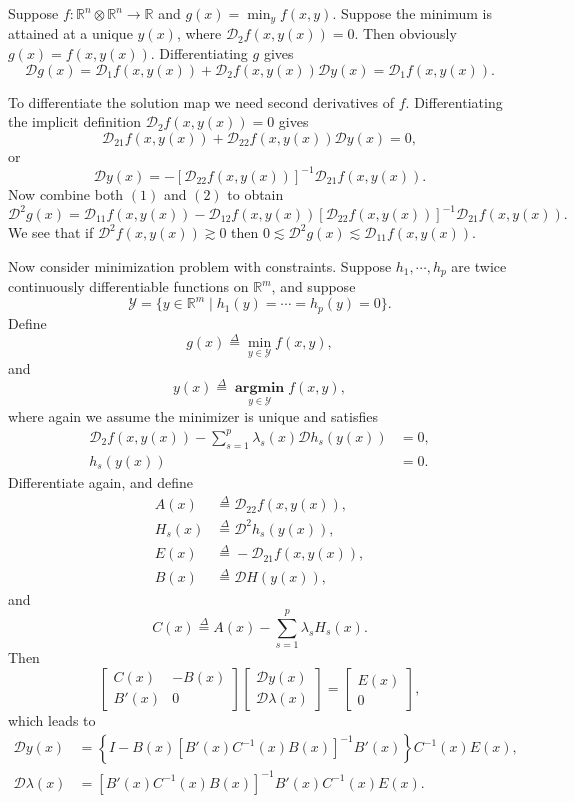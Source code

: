 \documentclass[
  12pt,
]{book}
\begin{document}
Suppose \(f:\mathbb{R}^n\otimes\mathbb{R}^n\rightarrow\mathbb{R}\) and \(g(x)=\min_y f(x,y)\). Suppose the minimum is attained at a unique \(y(x)\),
where \(\mathcal{D}_2f(x,y(x))=0.\) Then
obviously \(g(x)=f(x,y(x))\). Differentiating \(g\) gives
\[
\mathcal{D}g(x)=\mathcal{D}_1f(x,y(x))+\mathcal{D}_2f(x,y(x))\mathcal{D}y(x)=\mathcal{D}_1f(x,y(x)).\tag{1}
\]

To differentiate the solution map we need second derivatives of \(f\). Differentiating the implicit definition \(\mathcal{D}_2f(x,y(x))=0\) gives
\[
\mathcal{D}_{21}f(x,y(x))+\mathcal{D}_{22}f(x,y(x))\mathcal{D}y(x)=0,
\]
or
\[
\mathcal{D}y(x)=-[\mathcal{D}_{22}f(x,y(x))]^{-1}\mathcal{D}_{21}f(x,y(x)).\tag{2}
\]
Now combine both \((1)\) and \((2)\) to obtain
\[
\mathcal{D}^2g(x)=\mathcal{D}_{11}f(x,y(x))-\mathcal{D}_{12}f(x,y(x))[\mathcal{D}_{22}f(x,y(x))]^{-1}\mathcal{D}_{21}f(x,y(x)).\tag{3}
\]
We see that if \(\mathcal{D}^2f(x,y(x))\gtrsim 0\) then \(0\lesssim\mathcal{D}^2g(x)\lesssim\mathcal{D}_{11}f(x,y(x))\).

Now consider minimization problem with constraints. Suppose \(h_1,\cdots,h_p\) are twice continuously differentiable functions
on \(\mathbb{R}^m\), and suppose
\[
\mathcal{Y}=\{y\in\mathbb{R}^m\mid h_1(y)=\cdots=h_p(y)=0\}.
\]
Define
\[
g(x)\mathop{=}\limits^{\Delta}\min_{y\in\mathcal{Y}}f(x,y),
\]
and
\[
y(x)\mathop{=}\limits^{\Delta}\mathop{\mathbf{argmin}}\limits_{y\in\mathcal{Y}} f(x,y),
\]
where again we assume the minimizer is unique and satisfies
\begin{align*}
\mathcal{D}_2f(x,y(x))-\sum_{s=1}^p\lambda_s(x)\mathcal{D}h_s(y(x))&=0,\\
h_s(y(x))&=0.
\end{align*}
Differentiate again, and define
\begin{align*}
A(x)&\mathop{=}\limits^{\Delta}\mathcal{D}_{22}f(x,y(x)),\\
H_s(x)&\mathop{=}\limits^{\Delta}\mathcal{D}^2h_s(y(x)),\\
E(x)&\mathop{=}\limits^{\Delta}-\mathcal{D}_{21}f(x,y(x)),\\
B(x)&\mathop{=}\limits^{\Delta}\mathcal{D}H(y(x)),
\end{align*}
and
\[
C(x)\mathop{=}\limits^{\Delta}A(x)-\sum_{s=1}^p\lambda_sH_s(x).
\]
Then
\[
\begin{bmatrix}
C(x)&-B(x)\\
B'(x)&0
\end{bmatrix}
\begin{bmatrix}\mathcal{D}y(x)\\\mathcal{D}\lambda(x)\end{bmatrix}=
\begin{bmatrix}E(x)\\0\end{bmatrix},
\]
which leads to
\begin{align*}
\mathcal{D}y(x)&=\left\{I-B(x)\left[B'(x)C^{-1}(x)B(x)\right]^{-1}B'(x)\right\}C^{-1}(x)E(x),\\
\mathcal{D}\lambda(x)&=\left[B'(x)C^{-1}(x)B(x)\right]^{-1}B'(x)C^{-1}(x)E(x).
\end{align*}
\end{document}
